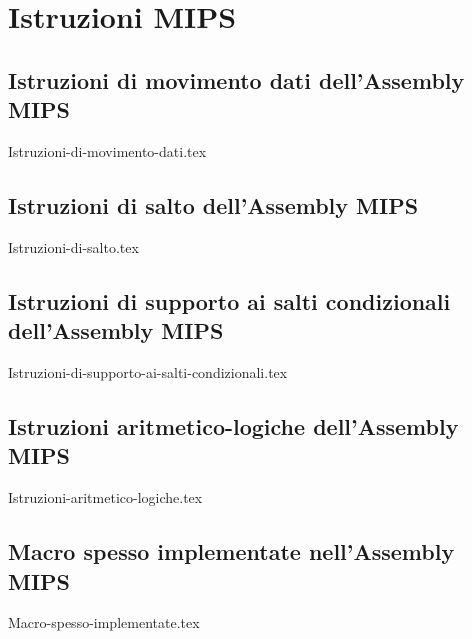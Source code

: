 \documentclass[class=book, crop=false]{standalone}
\begin{document}
\chapter{Istruzioni MIPS}

\section*{Istruzioni di movimento dati dell'Assembly MIPS}
\begin{table}[H]
	\centering
	{Istruzioni-di-movimento-dati.tex}
\end{table}

\section*{Istruzioni di salto dell'Assembly MIPS}
\begin{table}[H]
	\centering
	{Istruzioni-di-salto.tex}
\end{table}

\section*{Istruzioni di supporto ai salti condizionali dell'Assembly MIPS}
\begin{table}[H]
	\centering
	{Istruzioni-di-supporto-ai-salti-condizionali.tex}
\end{table}

\section*{Istruzioni aritmetico-logiche dell'Assembly MIPS}
\begin{table}[H]
	\centering
	{Istruzioni-aritmetico-logiche.tex}
\end{table}

\section*{Macro spesso implementate nell'Assembly MIPS}
\begin{table}[H]
	\centering
	{Macro-spesso-implementate.tex}
\end{table}
\end{document}
